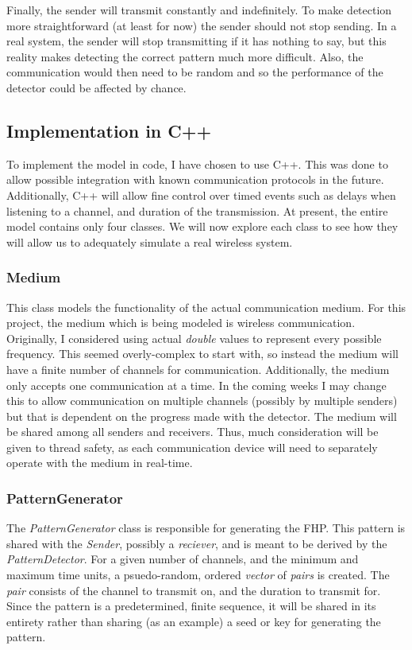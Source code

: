 \documentclass[conference]{IEEEtran}
\begin{document}
Finally, the sender will transmit constantly and indefinitely.
To make detection more straightforward (at least for now) the sender should not stop sending.
In a real system, the sender will stop transmitting if it has nothing to say, but this reality makes detecting the correct pattern much more difficult.
Also, the communication would then need to be random and so the performance of the detector could be affected by chance.

\subsection{Implementation in C++}
To implement the model in code, I have chosen to use C++.
This was done to allow possible integration with known communication protocols in the future.
Additionally, C++ will allow fine control over timed events such as delays when listening to a channel, and duration of the transmission.
At present, the entire model contains only four classes.
We will now explore each class to see how they will allow us to adequately simulate a real wireless system. 

\subsubsection{Medium}
This class models the functionality of the actual communication medium.
For this project, the medium which is being modeled is wireless communication.
Originally, I considered using actual \textit{double} values to represent every possible frequency.
This seemed overly-complex to start with, so instead the medium will have a finite number of channels for communication.
Additionally, the medium only accepts one communication at a time.
In the coming weeks I may change this to allow communication on multiple channels (possibly by multiple senders) but that is dependent on the progress made with the detector.
The medium will be shared among all senders and receivers.
Thus, much consideration will be given to thread safety, as each communication device will need to separately operate with the medium in real-time.

\subsubsection{PatternGenerator}
The \textit{PatternGenerator} class is responsible for generating the FHP.
This pattern is shared with the \textit{Sender}, possibly a \textit{reciever}, and is meant to be derived by the \textit{PatternDetector}.
For a given number of channels, and the minimum and maximum time units, a psuedo-random, ordered \textit{vector} of \textit{pairs} is created.
The \textit{pair} consists of the channel to transmit on, and the duration to transmit for.
Since the pattern is a predetermined, finite sequence, it will be shared in its entirety rather than sharing (as an example) a seed or key for generating the pattern.
\end{document}
